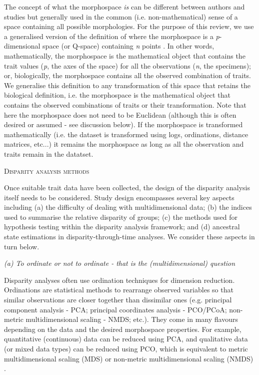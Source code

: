 \documentclass[12pt,letterpaper]{article}
\renewcommand{\section}[1]{%
\bigskip
\begin{center}
\begin{Large}
\normalfont\scshape #1
\medskip
\end{Large}
\end{center}}
\renewcommand{\subsection}[1]{%
\bigskip
\begin{center}
\begin{large}
\normalfont\itshape #1
\end{large}
\end{center}}
\begin{document}
The concept of what the morphospace \textit{is} can be different between authors and studies but generally used in the common (i.e. non-mathematical) sense of a space containing all possible morphologies.
For the purpose of this review, we use a generalised version of the definition of \cite{mitteroecker2009concept} where the morphospace is a \textit{p}-dimensional space (or Q-space) containing \textit{n} points \citep{mitteroecker2009concept}.
In other words, mathematically, the morphospace is the mathematical object that contains the trait values (\textit{p}, the axes of the space) for all the observations (\textit{n}, the specimens); or, biologically, the morphospace contains all the observed combination of traits.
We generalise this definition to any transformation of this space that retains the biological definition, i.e. the morphospace is the mathematical object that contains the observed combinations of traits or their transformation.
Note that here the morphospace does not need to be Euclidean (although this is often desired or assumed - see discussion below). %
If the morphospace is transformed mathematically (i.e. the dataset is transformed using logs, ordinations, distance matrices, etc...) it remains the morphospace as long as all the observation and traits remain in the datatset.

\section{Disparity analysis methods}

\noindent Once suitable trait data have been collected, the design of the disparity analysis itself needs to be considered.
Study design encompasses several key aspects including (a) the difficulty of dealing with multidimensional data; (b) the indices used to summarise the relative disparity of groups; (c) the methods used for hypothesis testing within the disparity analysis framework; and (d) ancestral state estimations in disparity-through-time analyses.
We consider these aspects in turn below.

\subsection{(a) To ordinate or not to ordinate - that is the (multidimensional) question}

Disparity analyses often use ordination techniques for dimension reduction.
Ordinations are statistical methods to rearrange observed variables so that similar observations are closer together than dissimilar ones (e.g. principal component analysis - PCA; principal coordinates analysis - PCO/PCoA; non-metric multidimensional scaling - NMDS; etc.).
They come in many flavours depending on the data and the desired morphospace properties.
For example, quantitative (continuous) data can be reduced using PCA, and qualitative data (or mixed data types) can be reduced using PCO, which is equivalent to metric multidimensional scaling (MDS) or non-metric multidimensional scaling (NMDS) \citep[see][chapter 9 for a detailed overview of ordination methods and properties]{Legendre2012-va}.
\end{document}

